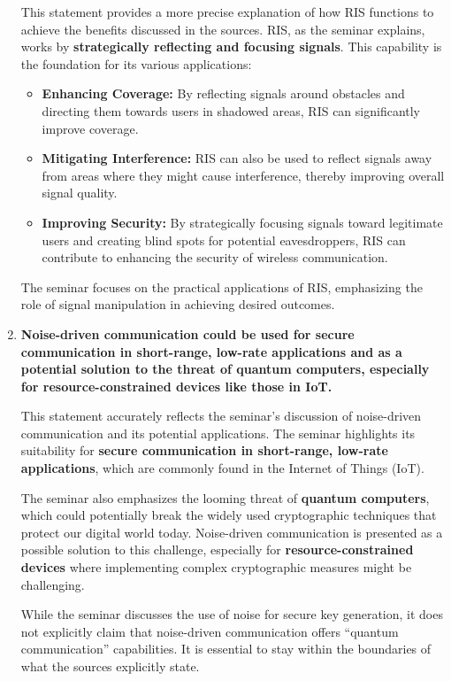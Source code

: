 \documentclass[
]{article}
\begin{document}
\begin{enumerate}
  This statement provides a more precise explanation of how RIS
  functions to achieve the benefits discussed in the sources. RIS, as
  the seminar explains, works by \textbf{strategically reflecting and
  focusing signals}. This capability is the foundation for its various
  applications:

  \begin{itemize}
  
  \item
    \textbf{Enhancing Coverage:} By reflecting signals around obstacles
    and directing them towards users in shadowed areas, RIS can
    significantly improve coverage.
  \item
    \textbf{Mitigating Interference:} RIS can also be used to reflect
    signals away from areas where they might cause interference, thereby
    improving overall signal quality.
  \item
    \textbf{Improving Security:} By strategically focusing signals
    toward legitimate users and creating blind spots for potential
    eavesdroppers, RIS can contribute to enhancing the security of
    wireless communication.
  \end{itemize}

  The seminar focuses on the practical applications of RIS, emphasizing
  the role of signal manipulation in achieving desired outcomes.
\item
  \textbf{Noise-driven communication could be used for secure
  communication in short-range, low-rate applications and as a potential
  solution to the threat of quantum computers, especially for
  resource-constrained devices like those in IoT.}

  This statement accurately reflects the seminar's discussion of
  noise-driven communication and its potential applications. The seminar
  highlights its suitability for \textbf{secure communication in
  short-range, low-rate applications}, which are commonly found in the
  Internet of Things (IoT).

  The seminar also emphasizes the looming threat of \textbf{quantum
  computers}, which could potentially break the widely used
  cryptographic techniques that protect our digital world today.
  Noise-driven communication is presented as a possible solution to this
  challenge, especially for \textbf{resource-constrained devices} where
  implementing complex cryptographic measures might be challenging.

  While the seminar discusses the use of noise for secure key
  generation, it does not explicitly claim that noise-driven
  communication offers ``quantum communication'' capabilities. It is
  essential to stay within the boundaries of what the sources explicitly
  state.
\end{enumerate}
\end{document}
